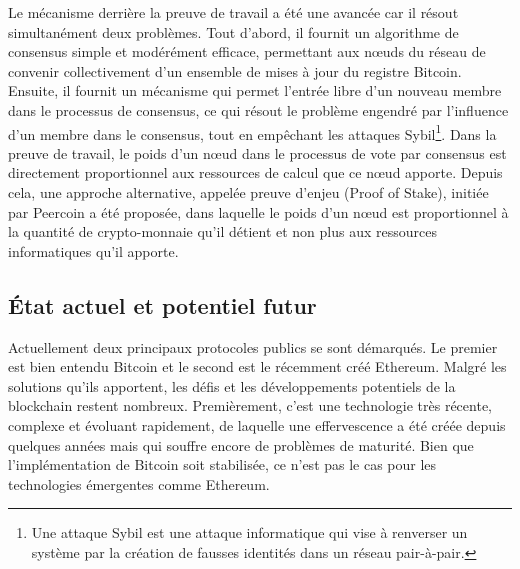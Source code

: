 \documentclass{tnreport}
\begin{document}
Le mécanisme derrière la preuve de travail a été une avancée car il résout simultanément deux problèmes. 
Tout d'abord, il fournit un algorithme de consensus simple et modérément efficace, permettant aux nœuds du réseau de convenir collectivement d'un ensemble de mises à jour du registre Bitcoin. 
Ensuite, il fournit un mécanisme qui permet l'entrée libre d'un nouveau membre dans le processus de consensus, ce qui résout le problème engendré par l'influence d'un membre dans le consensus, tout en empêchant les attaques Sybil\footnote{Une attaque Sybil est une attaque informatique qui vise à renverser un système par la création de fausses identités dans un réseau pair-à-pair.}. 
Dans la preuve de travail, le poids d'un nœud dans le processus de vote par consensus est directement proportionnel aux ressources de calcul que ce nœud apporte. 
Depuis cela, une approche alternative, appelée preuve d'enjeu (Proof of Stake), initiée par Peercoin\cite{peercoin} a été proposée, dans laquelle le poids d'un nœud est proportionnel à la quantité de crypto-monnaie qu'il détient et non plus aux ressources informatiques qu'il apporte.

\subsection{État actuel et potentiel futur}

Actuellement deux principaux protocoles publics se sont démarqués. Le premier est bien entendu Bitcoin et le second est le récemment créé Ethereum. 
Malgré les solutions qu'ils apportent, les défis et les développements potentiels de la blockchain restent nombreux.
Premièrement, c'est une technologie très récente, complexe et évoluant rapidement, de laquelle une effervescence a été créée depuis quelques années mais qui souffre encore de problèmes de maturité.
Bien que l'implémentation de Bitcoin soit stabilisée, ce n'est pas le cas pour les technologies émergentes comme Ethereum.
\end{document}
